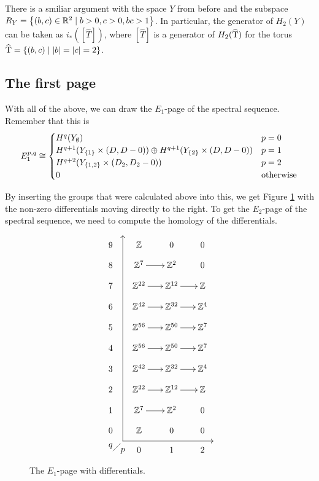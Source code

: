 There is a smiliar argument with the space $Y$ from before and the
subspace $R_Y = \left\{ (b,c) \in \mathbb{R}^2 \mid b > 0, c > 0, bc > 1 \right\}$. In
particular, the generator of $H_2(Y)$ can be taken as
$i_*\left([\widehat T]\right)$, where $[\widehat
  T]$ is a generator of $H_2(\widehat {\operatorname{T}})$ for the torus $\widehat {\operatorname{T}}
  = \left\{ (b,c)\mid \left| b \right|=\left| c \right| = 2 \right\}$.

\subsection{The first page}

With all of the above, we can draw the $E_1$-page of the spectral
sequence. Remember that this is
\[ E_1^{p,q} \cong
\begin{cases}
  H^{q}(Y_\emptyset) & p=0 \\
  H^{q+1}(Y_{\left\{ 1 \right\}} \times (D,D-0)) \oplus H^{q+1}(Y_{\left\{ 2 \right\}} \times
  (D,D-0)) & p=1 \\
  H^{q+2}(Y_{\left\{ 1,2 \right\}}\times (D_2,D_2-0)) & p = 2 \\
  0 & \text{otherwise}
\end{cases} \]

By inserting the groups that were calculated above into this, we get
Figure \ref{fig:e1} with the non-zero differentials moving directly to
the right. To get the $E_2$-page of the spectral sequence, we need to
compute the homology of the differentials.

\begin{figure}[ht]
  \[ \xy
  (5,4); (5,-80); **\dir{-}; (5,4); *\dir{>};
  (5,-80); (42,-80); **\dir{-}; *\dir{<};
  (0,-82)*{q}; (5,-84)*{p};
  (1,-84); (4,-81); **\dir{-};
  (0,0)\xymatrix@R=1em@C=1.7em{
    9 & \Z & 0 & 0 \\
    8 & \Z^7 \ar[r]& \Z^2 & 0 \\
    7 & \Z^{22} \ar[r]& \Z^{12} \ar[r]& \Z \\
    6 & \Z^{42} \ar[r]& \Z^{32} \ar[r]& \Z^{4} \\
    5 & \Z^{56} \ar[r]& \Z^{50} \ar[r]& \Z^{7} \\
    4 & \Z^{56} \ar[r]& \Z^{50} \ar[r]& \Z^{7} \\
    3 & \Z^{42} \ar[r]& \Z^{32} \ar[r]& \Z^{4} \\
    2 & \Z^{22} \ar[r]& \Z^{12} \ar[r]& \Z \\
    1 & \Z^{7} \ar[r]& \Z^{2} & 0 \\
    0 & \Z & 0 & 0 \\
    & 0 & 1 & 2
  } \endxy \]
  \caption{The $E_1$-page with differentials.}
  \label{fig:e1}
\end{figure}


